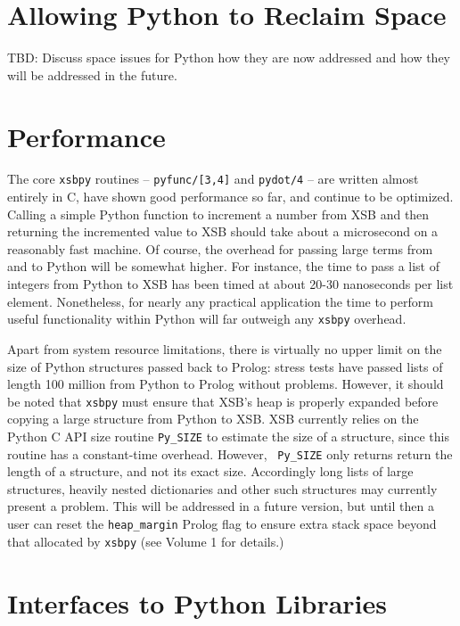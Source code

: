 \section{Allowing Python to Reclaim Space}
%
TBD: Discuss space issues for Python how they are now addressed and
how they will be addressed in the future.

\section{Performance}

The core {\tt xsbpy} routines -- {\tt pyfunc/[3,4]} and {\tt pydot/4}
-- are written almost entirely in C, have shown good performance so
far, and continue to be optimized.  Calling a simple Python function
to increment a number from XSB and then returning the incremented
value to XSB should take about a microsecond on a reasonably fast
machine.  Of course, the overhead for passing large terms from and to
Python will be somewhat higher.  For instance, the time to pass a list
of integers from Python to XSB has been timed at about 20-30
nanoseconds per list element.  Nonetheless, for nearly any practical
application the time to perform useful functionality within Python
will far outweigh any {\tt xsbpy} overhead.

Apart from system resource limitations, there is virtually no upper
limit on the size of Python structures passed back to Prolog: stress
tests have passed lists of length 100 million from Python to Prolog
without problems. However, it should be noted that {\tt xsbpy} must
ensure that XSB's heap is properly expanded before copying a large
structure from Python to XSB.  XSB currently relies on the Python C
API size routine {\tt Py\_SIZE} to estimate the size of a structure,
since this routine has a constant-time overhead.  However, {\tt
  Py\_SIZE} only returns return the length of a structure, and not its
exact size.  Accordingly long lists of large structures, heavily
nested dictionaries and other such structures may currently present a
problem.  This will be addressed in a future version, but until then a
user can reset the {\tt heap\_margin} Prolog flag to ensure extra
stack space beyond that allocated by {\tt xsbpy} (see Volume 1 for
details.)

\section{Interfaces to Python Libraries}

